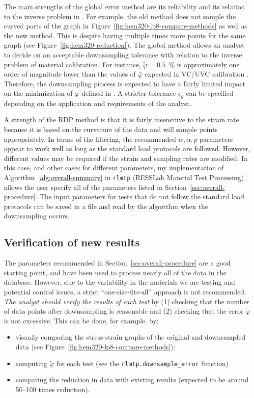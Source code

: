 \documentclass[a4paper,11pt]{article}
\begin{document}
The main strengths of the global error method are its reliability and its relation to the inverse problem in \citet{deCastroeSousaConsistencySolvingInverse2020}.
For example, the old method does not sample the curved parts of the graph in Figure~\ref{fig:hem320-lp8-compare-methods} as well as the new method.
This is despite having multiple times more points for the same graph (see Figure~\ref{fig:hem320-reduction}).
The global method allows an analyst to decide on an acceptable downsampling tolerance with relation to the inverse problem of material calibration.
For instance, $\tilde{\varphi} = 0.5$~\% is approximately one order of magnitude lower than the values of $\bar{\varphi}$ expected in VC/UVC calibration \citep{deCastroeSousaConsistencySolvingInverse2020}.
Therefore, the downsampling process is expected to have a fairly limited impact on the minimization of $\varphi$ defined in \citet{deCastroeSousaConsistencySolvingInverse2020}.
A stricter tolerance $\epsilon_g$ can be specified depending on the application and requirements of the analyst.

A strength of the RDP method is that it is fairly insensitive to the strain rate because it is based on the curvature of the data and will sample points appropriately.
In terms of the filtering, the recommended $w, \alpha, p$ parameters appear to work well as long as the standard load protocols are followed.
However, different values may be required if the strain and sampling rates are modified.
In this case, and other cases for different parameters, my implementation of Algorithm~\ref{alg:overall-summary} in \texttt{rlmtp} (RESSLab Material Test Processing) allows the user specify all of the parameters listed in Section~\ref{sec:overall-procedure}.
The input parameters for tests that do not follow the standard load protocols can be saved in a file and read by the algorithm when the downsampling occurs.

\subsection{Verification of new results}

The parameters recommended in Section~\ref{sec:overall-procedure} are a good starting point, and have been used to process nearly all of the data in the database.
However, due to the variability in the materials we are testing and potential control issues, a strict ``one-size-fits-all'' approach is not recommended.
\emph{The analyst should verify the results of each test} by (1) checking that the number of data points after downsampling is reasonable and (2) checking that the error $\tilde{\varphi}$ is not excessive.
This can be done, for example, by:
\begin{itemize}
    \item visually comparing the stress-strain graphs of the original and downsampled data (see Figure~\ref{fig:hem320-lp8-compare-methods});
    \item computing $\tilde{\varphi}$ for each test (see the \texttt{rlmtp.downsample\_error} function)
    \item comparing the reduction in data with existing results (expected to be around 50--100 times reduction).
\end{itemize}
\end{document}
